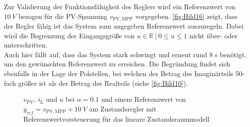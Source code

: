 Zur Validierung der Funktionsfähigkeit des Reglers wird ein Referenzwert von $\SI{+10}{V}$ bezogen für die PV-Spannung $v_{\mathrm{PV,MPP}}$ vorgegeben. \autoref{fig:Bild16} zeigt, dass der Regler fähig ist das System zum angegeben Referenzwert auszuregeln. Dabei wird die Begrenzung der Eingangsgröße von $u \in \mathbb{R} \: | \: 0 \leq u \leq 1$ nicht über- oder unterschritten. \\
Auch hier fällt auf, dass das System stark schwingt und erneut rund $\SI{8}{s}$ benötigt, um den gewünschten Referenzwert zu erreichen. Die Begründung findet sich ebenfalls in der Lage der Polstellen, bei welchen der Betrag des Imaginärteils 50-fach größer ist als der Betrag des Realteils (siehe \autoref{fig:Bild10}).

\begin{figure}[H]
    \centering
    \caption[Validierung Regler mit Vorsteuerung (linear)]{$v_{\mathrm{PV}}$, $i_{\mathrm{L}}$ und $u$ bei $\alpha = 0.1$ und einem Referenzwert von $y_{ref} = v_{\mathrm{PV,MPP}} + \SI{10}{V}$ am Zustandsregler mit Referenzwertvorsteuerung für das lineare Zustandsraummodell}
    \label{fig:Bild16}
\end{figure}

